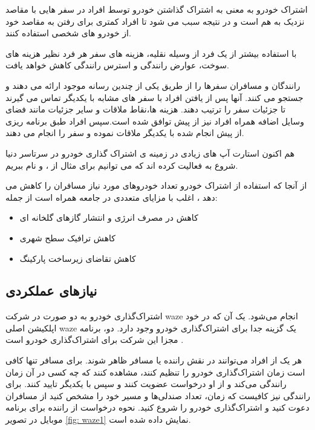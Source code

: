 اشتراک خودرو به معنی به اشتراک گذاشتن خودرو توسط افراد در سفر هایی با مقاصد نزدیک به هم است و در نتیجه سبب می شود تا افراد کمتری برای رفتن به مقاصد خود از خودرو های شخصی استفاده کنند.

با استفاده بیشتر از یک فرد از وسیله نقلیه، هزینه های سفر هر فرد نظیر  هزینه های سوخت، عوارض رانندگی و استرس رانندگی کاهش خواهد یافت.

رانندگان و مسافران سفرها را از طریق یکی از چندین رسانه موجود ارائه می دهند و جستجو می کنند. آنها پس از یافتن افراد با سفر های مشابه با یکدیگر تماس می گیرند تا جزئیات سفر را ترتیب دهند. هزینه ها،‌نقاط ملاقات و سایر جزئیات مانند فضای وسایل اضافه همراه افراد نیز از پیش توافق شده است.‌‌سپس افراد طبق برنامه ریزی از پیش انجام شده با یکدیگر ملاقات نموده و سفر را انجام می دهند.

هم اکنون استارت آپ های زیادی در زمینه ی اشتراک گذاری خودرو در سرتاسر دنیا شروع به فعالیت کرده اند که می توانیم برای مثال از  ،  و  نام ببریم.

از آنجا که استفاده از اشتراک خودرو تعداد خودر‌و‌های مورد نیاز مسافران را کاهش می دهد ، اغلب با مزایای متعددی در جامعه همراه است از جمله: 
\begin{itemize}
\item
کاهش در مصرف انرژی و انتشار گازهای گلخانه ای
\item
کاهش ترافیک سطح شهری
\item
کاهش تقاضای زیرساخت پارکینگ
\end{itemize}

\subsection{نیازهای عملکردی }
اشتراک‌گذاری خودرو به دو صورت در شرکت waze انجام می‌شود. یک آن که در خود اپلکیشن اصلی waze یک گزینه جدا برای اشتراک‌گذاری خودرو وجود دارد. دو، برنامه مجزا این شرکت برای اشتراک‌گذاری خودرو است \cite{waze_carpool} .

هر یک از افراد می‌توانند در نقش راننده یا مسافر ظاهر شوند. برای مسافر تنها کافی است زمان اشتراک‌گذاری خودرو را تنظیم کنند، مشاهده کنند که چه کسی در آن زمان رانندگی می‌کند و از او درخواست عضویت کنند و سپس با یکدیگر تایید کنند.
برای رانندگی نیز کافیست که زمان، تعداد صندلی‌ها و مسیر خود را مشخص کنید از مسافران دعوت کنید و اشتراک‌گذاری خودرو را شروع کنید. نحوه درخواست از راننده برای برنامه موبایل در تصویر \ref{fig: waze1} نمایش داده شده است.


